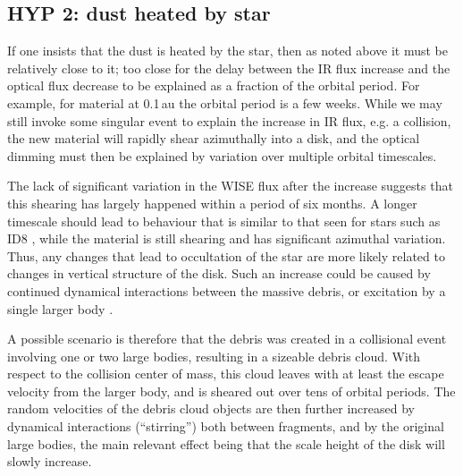 \documentclass{aa}
\begin{document}
\subsection{HYP 2: dust heated by star}

If one insists that the dust is heated by the star, then as noted above it must be relatively close to it; too close for the delay between the IR flux increase and the optical flux decrease to be explained as a fraction of the orbital period.
%
For example, for material at 0.1\,au the orbital period is a few weeks.
%
While we may still invoke some singular event to explain the increase in IR flux, e.g. a collision, the new material will rapidly shear azimuthally into a disk, and the optical dimming must then be explained by variation over multiple orbital timescales.

The lack of significant variation in the WISE flux after the increase suggests that this shearing has largely happened within a period of six months.
%
A longer timescale should lead to behaviour that is similar to that seen for stars such as ID8 \citep{2014Sci...345.1032M}, while the material is still shearing and has significant azimuthal variation.
%
Thus, any changes that lead to occultation of the star are more likely related to changes in vertical structure of the disk.
%
Such an increase could be caused by continued dynamical interactions between the massive debris, or excitation by a single larger body \citep[e.g.][]{1992Icar...96..107I}.

A possible scenario is therefore that the debris was created in a collisional event involving one or two large bodies, resulting in a sizeable debris cloud.
%
With respect to the collision center of mass, this cloud leaves with at least the escape velocity from the larger body, and is sheared out over tens of orbital periods.
%
The random velocities of the debris cloud objects are then further increased by dynamical interactions (``stirring'') both between fragments, and by the original large bodies, the main relevant effect being that the scale height of the disk will slowly increase.
\end{document}
